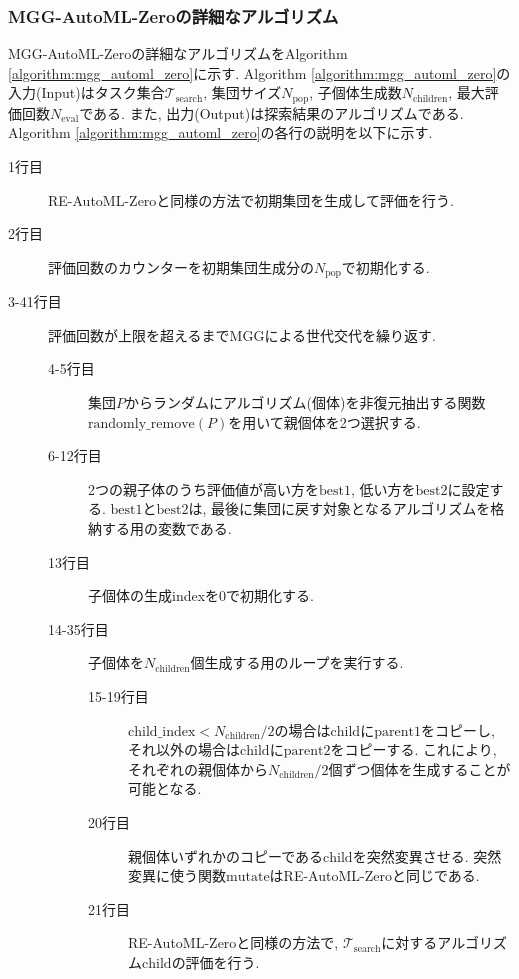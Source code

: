 \documentclass[11pt,oneside,openany,report]{jsbook}
\begin{document}
\subsubsection{MGG-AutoML-Zeroの詳細なアルゴリズム}\label{subsubsec:mgg_automl_zero_av:suggest:mgg:detail}

MGG-AutoML-Zeroの詳細なアルゴリズムをAlgorithm \ref{algorithm:mgg_automl_zero}に示す. Algorithm \ref{algorithm:mgg_automl_zero}の入力(Input)はタスク集合$\mathcal{T}_\mathrm{search}$, 集団サイズ$N_\mathrm{pop}$, 子個体生成数$N_\mathrm{children}$, 最大評価回数$ N_\mathrm{eval}$である. また, 出力(Output)は探索結果のアルゴリズムである. Algorithm \ref{algorithm:mgg_automl_zero}の各行の説明を以下に示す.

\begin{description}
  \item[1行目] RE-AutoML-Zeroと同様の方法で初期集団を生成して評価を行う.
  \item[2行目] 評価回数のカウンターを初期集団生成分の$N_\mathrm{pop}$で初期化する.
  \item[3-41行目] 評価回数が上限を超えるまでMGGによる世代交代を繰り返す.
    \begin{description}
      \item[4-5行目] 集団$P$からランダムにアルゴリズム(個体)を非復元抽出する関数$\mathrm{randomly\_remove}(P)$を用いて親個体を2つ選択する.
      \item[6-12行目] 2つの親子体のうち評価値が高い方を$\mathrm{best}1$, 低い方を$\mathrm{best}2$に設定する. $\mathrm{best}1$と$\mathrm{best}2$は, 最後に集団に戻す対象となるアルゴリズムを格納する用の変数である.
      \item[13行目] 子個体の生成indexを0で初期化する.
      \item[14-35行目] 子個体を$N_\mathrm{children}$個生成する用のループを実行する.
        \begin{description}
          \item[15-19行目] $\mathrm{child\_index} < N_\mathrm{children} / 2$の場合は$\mathrm{child}$に$\mathrm{parent}1$をコピーし, それ以外の場合は$\mathrm{child}$に$\mathrm{parent}2$をコピーする. これにより, それぞれの親個体から$N_\mathrm{children} / 2$個ずつ個体を生成することが可能となる.
          \item[20行目] 親個体いずれかのコピーである$\mathrm{child}$を突然変異させる. 突然変異に使う関数$\mathrm{mutate}$はRE-AutoML-Zeroと同じである.
          \item[21行目] RE-AutoML-Zeroと同様の方法で, $\mathcal{T}_\mathrm{search}$に対するアルゴリズム$\mathrm{child}$の評価を行う.

\end{description}
\end{description}
\end{description}
\end{document}
